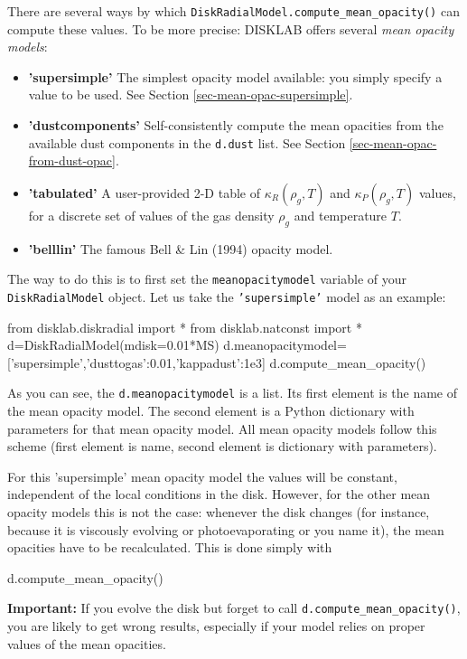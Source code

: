 \documentclass{book}
\newcommand{\code}[1]{{\small\tt #1}}
\begin{document}
There are several ways by which \code{DiskRadialModel.compute\_mean\_opacity()} can
compute these values. To be more precise: {\sf DISKLAB} offers several {\em
  mean opacity models}:
\begin{itemize}
\item {\bf 'supersimple'} The simplest opacity model available: you simply specify
  a value to be used. See Section \ref{sec-mean-opac-supersimple}.
\item {\bf 'dustcomponents'} Self-consistently compute the mean opacities from
  the available dust components in the \code{d.dust} list. See Section
  \ref{sec-mean-opac-from-dust-opac}.
\item {\bf 'tabulated'} A user-provided 2-D table of $\kappa_R(\rho_g,T)$
  and $\kappa_P(\rho_g,T)$ values, for a discrete set of values of the
  gas density $\rho_g$ and temperature $T$.
\item {\bf 'belllin'} The famous Bell \& Lin (1994) opacity model.
\end{itemize}

The way to do this is to first set the \code{meanopacitymodel} variable of your
\code{DiskRadialModel} object. Let us take the \code{'supersimple'} model as an
example:
\begin{codebox}
from disklab.diskradial import *
from disklab.natconst import *
d=DiskRadialModel(mdisk=0.01*MS)
d.meanopacitymodel=['supersimple',{'dusttogas':0.01,'kappadust':1e3}]
d.compute_mean_opacity()
\end{codebox}
As you can see, the \code{d.meanopacitymodel} is a list. Its first element is
the name of the mean opacity model. The second element is a Python dictionary
with parameters for that mean opacity model.  All mean opacity models follow
this scheme (first element is name, second element is dictionary with
parameters).

For this 'supersimple' mean opacity model the values will be constant, independent
of the local conditions in the disk. However, for the other mean opacity models this
is not the case: whenever the disk changes (for instance, because it is viscously
evolving or photoevaporating or you name it), the mean opacities have to be
recalculated. This is done simply with
\begin{codebox}
d.compute_mean_opacity()
\end{codebox}

{\bf Important:} If you evolve the disk but forget to call \code{d.compute\_mean\_opacity()},
you are likely to get wrong results, especially if your model relies on proper values
of the mean opacities.
\end{document}
